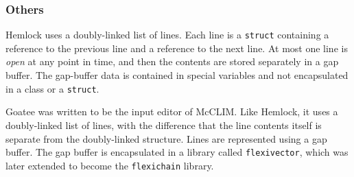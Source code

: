 \subsubsection{Others}

Hemlock uses a doubly-linked list of lines.  Each line is a
\texttt{struct} containing a reference to the previous line and a
reference to the next line.  At most one line is \emph{open} at any
point in time, and then the contents are stored separately in a gap
buffer.  The gap-buffer data is contained in special variables and not
encapsulated in a class or a \texttt{struct}.

Goatee was written to be the input editor of McCLIM.  Like Hemlock, it
uses a doubly-linked list of lines, with the difference that the line
contents itself is separate from the doubly-linked structure.  Lines
are represented using a gap buffer.  The gap buffer is encapsulated in
a library called \texttt{flexivector}, which was later extended to
become the \texttt{flexichain} library.
